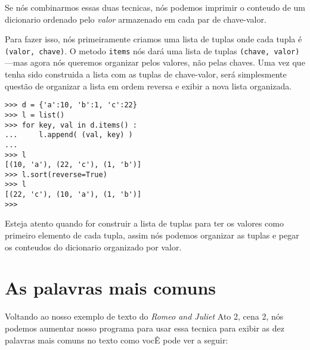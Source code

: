 Se nós combinarmos essas duas tecnicas, nós podemos imprimir o conteudo
de um dicionario ordenado pelo \emph{valor} armazenado em cada par de 
chave-valor.

Para fazer isso, nós primeiramente criamos uma lista de tuplas onde cada tupla é
{\tt (valor, chave)}. O metodo {\tt items} nós dará uma lista de tuplas 
{\tt (chave, valor)} ---mas agora nós queremos organizar pelos valores, não pelas chaves.
Uma vez que tenha sido construida a lista com as tuplas de chave-valor, será
simplesmente questão de organizar a lista em ordem reversa e exibir a nova 
lista organizada.

\beforeverb
\begin{verbatim}
>>> d = {'a':10, 'b':1, 'c':22}
>>> l = list()
>>> for key, val in d.items() :
...     l.append( (val, key) )
... 
>>> l
[(10, 'a'), (22, 'c'), (1, 'b')]
>>> l.sort(reverse=True)
>>> l
[(22, 'c'), (10, 'a'), (1, 'b')]
>>> 
\end{verbatim}
\afterverb
%
Esteja atento quando for construir a lista de tuplas para ter os valores como
primeiro elemento de cada tupla, assim nós podemos organizar as tuplas e pegar os
conteudos do dicionario organizado por valor.

\section{As palavras mais comuns}

Voltando ao nosso exemplo de texto do \emph{Romeo and Juliet}
Ato 2, cena 2, nós podemos aumentar nosso programa para usar essa tecnica
para exibir as dez palavras mais comuns no texto como vocÊ pode ver a seguir:

